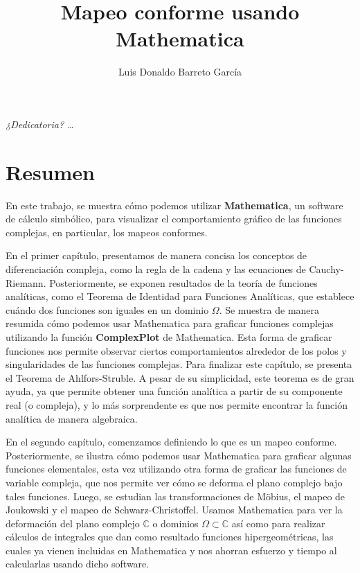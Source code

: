 \documentclass[letterpaper,12pt,openany]{book}
\author{Luis Donaldo Barreto García}
\title{Mapeo conforme usando Mathematica}
\theoremstyle{definition}
\theoremstyle{definition}
\theoremstyle{definition}
\theoremstyle{definition}
\theoremstyle{definition}
\theoremstyle{remark}
\theoremstyle{definition}
\newcommand{\C}{\mathbb{C}}
\begin{document}
	
	\maketitle  
	
	\thispagestyle{empty} 
	
	\frontmatter
	
	\chapter*{}
	\begin{flushright}%
		\emph{¿Dedicatoria? \ldots}
		\thispagestyle{empty}
	\end{flushright}
	
	\chapter*{Resumen}
	En este trabajo, se muestra cómo podemos utilizar \textbf{Mathematica}, un software de cálculo simbólico, para visualizar el comportamiento gráfico de las funciones complejas, en particular, los mapeos conformes.
	
	En el primer capítulo, presentamos de manera concisa los conceptos de diferenciación compleja, como la regla de la cadena y las ecuaciones de Cauchy-Riemann. Posteriormente, se exponen resultados de la teoría de funciones analíticas, como el Teorema de Identidad para Funciones Analíticas, que establece cuándo dos funciones son iguales en un dominio $\Omega$. Se muestra de manera resumida cómo podemos usar Mathematica para graficar funciones complejas utilizando la función \textbf{ComplexPlot} de Mathematica. Esta forma de graficar funciones nos permite observar ciertos comportamientos alrededor de los polos y singularidades de las funciones complejas. Para finalizar este capítulo, se presenta el Teorema de Ahlfors-Struble. A pesar de su simplicidad, este teorema es de gran ayuda, ya que permite obtener una función analítica a partir de su componente real (o compleja), y lo más sorprendente es que nos permite encontrar la función analítica de manera algebraica.
	
	En el segundo capítulo, comenzamos definiendo lo que es un mapeo conforme. Posteriormente, se ilustra cómo podemos usar Mathematica para graficar algunas funciones elementales, esta vez utilizando otra forma de graficar las funciones de variable compleja, que nos permite ver cómo se deforma el plano complejo bajo tales funciones. Luego, se estudian las transformaciones de Möbius, el mapeo de Joukowski y el mapeo de Schwarz-Christoffel. Usamos Mathematica para ver la deformación del plano complejo $\C$ o dominios $\Omega\subset\C$ así como para realizar cálculos de integrales que dan como resultado funciones hipergeométricas, las cuales ya vienen incluidas en Mathematica y nos ahorran esfuerzo y tiempo al calcularlas usando dicho software.
	
\end{document}

